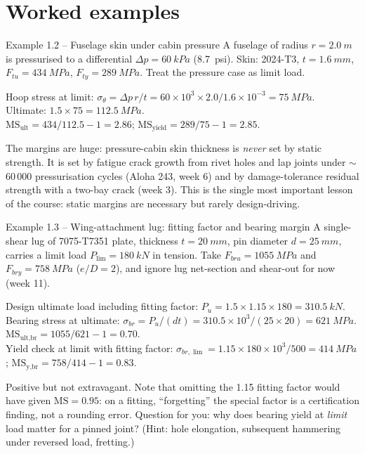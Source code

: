 \documentclass[11pt,a4paper]{article}
\begin{document}
\section{Worked examples}

\begin{examplebox}{Example 1.2 -- Fuselage skin under cabin pressure}
A fuselage of radius $r=\SI{2.0}{m}$ is pressurised to a differential $\Delta p = \SI{60}{kPa}$ (\SI{8.7}{psi}). Skin: 2024-T3, $t=\SI{1.6}{mm}$, $F_{tu}=\SI{434}{MPa}$, $F_{ty}=\SI{289}{MPa}$. Treat the pressure case as limit load.

Hoop stress at limit: $\sigma_\theta = \Delta p\, r/t = 60\times10^{3}\times 2.0/1.6\times10^{-3} = \SI{75}{MPa}$.\\
Ultimate: $1.5\times 75 = \SI{112.5}{MPa}$.\\
$\mathrm{MS}_{\text{ult}} = 434/112.5 - 1 = 2.86$; $\mathrm{MS}_{\text{yield}} = 289/75 - 1 = 2.85$.

The margins are huge: pressure-cabin skin thickness is \emph{never} set by static strength. It is set by fatigue crack growth from rivet holes and lap joints under $\sim$60\,000 pressurisation cycles (Aloha 243, week 6) and by damage-tolerance residual strength with a two-bay crack (week 3). This is the single most important lesson of the course: static margins are necessary but rarely design-driving.
\end{examplebox}

\begin{examplebox}{Example 1.3 -- Wing-attachment lug: fitting factor and bearing margin}
A single-shear lug of 7075-T7351 plate, thickness $t=\SI{20}{mm}$, pin diameter $d=\SI{25}{mm}$, carries a limit load $P_{\lim}=\SI{180}{kN}$ in tension. Take $F_{bru}=\SI{1055}{MPa}$ and $F_{bry}=\SI{758}{MPa}$ ($e/D=2$), and ignore lug net-section and shear-out for now (week 11).

Design ultimate load including fitting factor: $P_{u} = 1.5 \times 1.15 \times 180 = \SI{310.5}{kN}$.\\
Bearing stress at ultimate: $\sigma_{br} = P_u/(d t) = 310.5\times10^{3}/(25\times20) = \SI{621}{MPa}$.\\
$\mathrm{MS}_{\text{ult,br}} = 1055/621 - 1 = 0.70$.\\
Yield check at limit with fitting factor: $\sigma_{br,\lim} = 1.15\times180\times10^{3}/500 = \SI{414}{MPa}$; $\mathrm{MS}_{\text{y,br}} = 758/414-1 = 0.83$.

Positive but not extravagant. Note that omitting the 1.15 fitting factor would have given $\mathrm{MS}=0.95$: on a fitting, ``forgetting'' the special factor is a certification finding, not a rounding error. Question for you: why does bearing yield at \emph{limit} load matter for a pinned joint? (Hint: hole elongation, subsequent hammering under reversed load, fretting.)
\end{examplebox}
\end{document}
